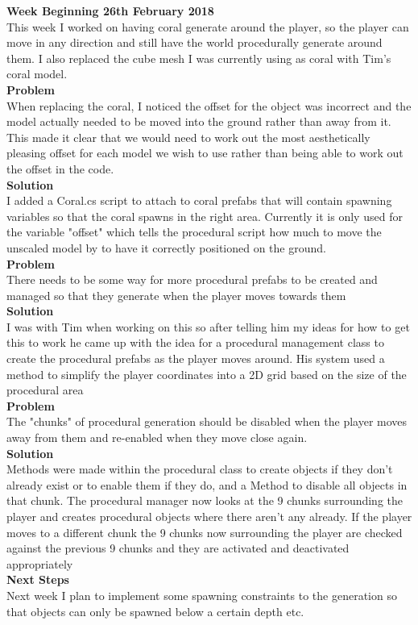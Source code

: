 \documentclass[10pt, a4paper]{article}
\begin{document}
	\textbf{Week Beginning 26th February 2018}\\
	This week I worked on having coral generate around the player, so the player can move in any direction and still have the world procedurally generate around them. I also replaced the cube mesh I was currently using as coral with Tim's coral model.\\
	\textbf{Problem}\\
	When replacing the coral, I noticed the offset for the object was incorrect and the model actually needed to be moved into the ground rather than away from it. This made it clear that we would need to work out the most aesthetically pleasing offset for each model we wish to use rather than being able to work out the offset in the code.\\
	\textbf{Solution}\\
	I added a Coral.cs script to attach to coral prefabs that will contain spawning variables so that the coral spawns in the right area. Currently it is only used for the variable "offset" which tells the procedural script how much to move the unscaled model by to have it correctly positioned on the ground.\\
	\textbf{Problem}\\
	There needs to be some way for more procedural prefabs to be created and managed so that they generate when the player moves towards them\\
	\textbf{Solution}\\
	I was with Tim when working on this so after telling him my ideas for how to get this to work he came up with the idea for a procedural management class to create the procedural prefabs as the player moves around. His system used a method to simplify the player coordinates into a 2D grid based on the size of the procedural area\\
	\textbf{Problem}\\
	The "chunks" of procedural generation should be disabled when the player moves away from them and re-enabled when they move close again.\\
	\textbf{Solution}\\
	Methods were made within the procedural class to create objects if they don't already exist or to enable them if they do, and a Method to disable all objects in that chunk. The procedural manager now looks at the 9 chunks surrounding the player and creates procedural objects where there aren't any already. If the player moves to a different chunk the 9 chunks now surrounding the player are checked against the previous 9 chunks and they are activated and deactivated appropriately\\
	\textbf{Next Steps}\\
	Next week I plan to implement some spawning constraints to the generation so that objects can only be spawned below a certain depth etc.\\\\
	
\end{document}
